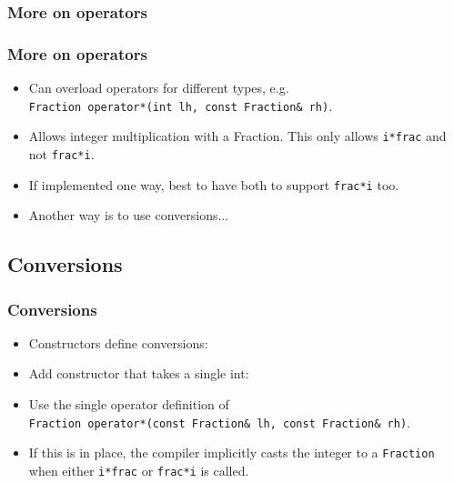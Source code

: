 \documentclass{beamer}
\begin{document}
\subsubsection{More on operators}
\begin{frame}
\frametitle{More on operators}
\begin{itemize}
\item Can overload operators for different types, e.g.\\ \texttt{Fraction {\color{blue}operator}*({\color{blue}int} lh, {\color{blue}const} Fraction\& rh)}.
\item Allows integer multiplication with a Fraction. This only allows \texttt{i*frac} and not \texttt{frac*i}.
\item If implemented one way, best to have both to support \texttt{frac*i} too.
\item Another way is to use conversions...
\end{itemize}
\end{frame}
\subsection{Conversions}
\begin{frame}
\frametitle{Conversions}
\begin{itemize}
\item Constructors define conversions:
\item Add constructor that takes a single int:
\con
\item Use the single operator definition of \\
\texttt{Fraction {\color{blue}operator}*({\color{blue}const} Fraction\& lh, {\color{blue}const} Fraction\& rh)}.
\item If this is in place, the compiler {\color{green} implicitly} casts the integer to a \texttt{Fraction} when either \texttt{i*frac} or \texttt{frac*i} is called.
\end{itemize}
\end{frame}

\end{document}
